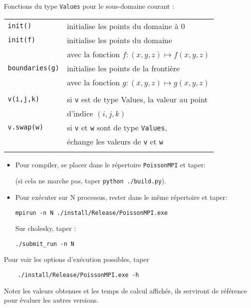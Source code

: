 \documentclass{beamer}
\begin{document}
\begin{frame}
Fonctions du type {\tt Values} pour le sous-domaine courant :
\bigskip

\begin{tabular}{ll}
	{\tt init()} & initialise les points du domaine à 0 \\
	{\tt init(f)}& initialise les points du domaine \\ & avec la fonction $f : (x,y,z) \mapsto f(x,y,z)$\\
	{\tt boundaries(g)} & initialise les points de la frontière \\ &  avec la fonction $g: (x,y,z) \mapsto g(x,y,z)$\\ \\
	{\tt v(i,j,k)}& si {\tt v} est de type {Values}, la valeur au point \\ &  d'indice $(i,j,k)$ \\
	{\tt v.swap(w)} & si {\tt v} et {\tt w} sont de type {\tt Values}, \\ & échange les valeurs de {\tt v} et {\tt w} \\ \\
\end{tabular}

\end{frame}

\begin{frame}[fragile]
\vfill

	
\begin{itemize}
\item 	Pour compiler, se placer dans le répertoire {\tt PoissonMPI} et taper:

		
\vfill
		(si cela ne marche pas, taper \verb|python ./build.py|).
		
\vfill
	\item Pour exécuter sur N processus, rester dans le même répertoire et taper:

\hspace{0.5cm}
{\color{blue}\begin{verbatim}
mpirun -n N ./install/Release/PoissonMPI.exe
\end{verbatim}
}

\vfill
Sur cholesky, taper :

\hspace{0.5cm}
{\color{blue}\begin{verbatim}
./submit_run -n N
\end{verbatim}
}
\end{itemize}

\vfill
Pour voir les options d'exécution possibles, taper {\color{blue}\begin{verbatim}
	./install/Release/PoissonMPI.exe -h
\end{verbatim}
}

\vfill
Noter les valeurs obtenues et les temps de calcul affichés, ils serviront de référence pour évaluer les autres versions. 
\vfill
\end{frame}
\end{document}
